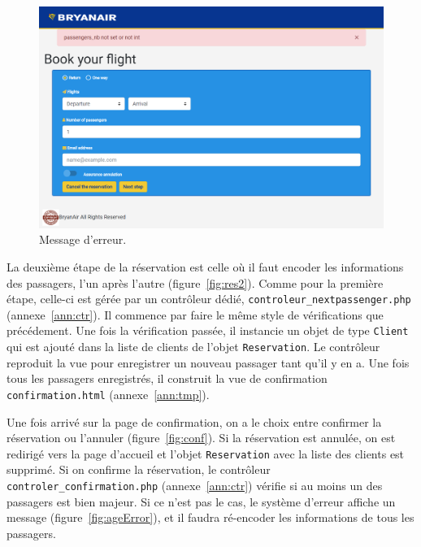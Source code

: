\documentclass[12pt,a4paper]{article}
\begin{document}
			\begin{figure}[!ht]
         \includegraphics[width=\textwidth]{Error.png}
				\caption{Message d'erreur.}
				\label{fig:error}
			\end{figure}

			La deuxième étape de la réservation est celle où il faut encoder les informations des passagers, l'un après l'autre (figure~\ref{fig:res2}). Comme pour la première étape, celle-ci est gérée par un contrôleur dédié, \texttt{controleur\_nextpassenger.php} (annexe~\ref{ann:ctr}). Il commence par faire le même style de vérifications que précédement. Une fois la vérification passée, il instancie un objet de type \texttt{Client} qui est ajouté dans la liste de clients de l'objet \texttt{Reservation}. Le contrôleur reproduit la vue pour enregistrer un nouveau passager tant qu'il y en a. Une fois tous les passagers enregistrés, il construit la vue de confirmation \texttt{confirmation.html} (annexe~\ref{ann:tmp}).

			Une fois arrivé sur la page de confirmation, on a le choix entre confirmer la réservation ou l'annuler (figure~\ref{fig:conf}). Si la réservation est annulée, on est redirigé vers la page d'accueil et l'objet \texttt{Reservation} avec la liste des clients est supprimé. Si on confirme la réservation, le contrôleur \texttt{controler\_confirmation.php} (annexe~\ref{ann:ctr}) vérifie si au moins un des passagers est bien majeur. Si ce n'est pas le cas, le système d'erreur affiche un message (figure~\ref{fig:ageError}), et il faudra ré-encoder les informations de tous les passagers.
\end{document}
